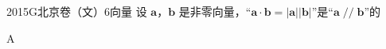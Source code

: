 
\begin{problem}{2015}{G}{北京卷（文）}{6}{向量}
设 $ \boldsymbol{a} $，$ \boldsymbol{b} $ 是非零向量，“$ \boldsymbol{a}\cdot\boldsymbol{b}=|\boldsymbol{a}||\boldsymbol{b}| $”是“$ \boldsymbol{a}\mathop{//}\boldsymbol{b} $”的
\begin{choices}
\end{choices}
\end{problem}

\begin{answer}
A
\end{answer}

\begin{solutions}

\end{solutions}